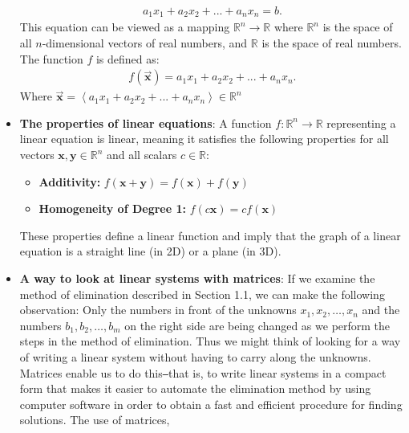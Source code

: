 \documentclass{report}
\begin{document}
\begin{itemize}
            \begin{align*}
                a_{1}x_{1} + a_{2}x_{2} + ... + a_{n}x_{n} = b
            .\end{align*}
            \bigbreak \noindent 
            This equation can be viewed as a mapping $\mathbb{R}^{n} \to \mathbb{R}$ where $\mathbb{R}^{n}$ is the space of all $n$-dimensional vectors of real numbers, and $\mathbb{R}$ is the space of real numbers. The function $f$ is defined as:
            \begin{align*}
                f(\vec{\mathbf{x}}) =  a_{1}x_{1} + a_{2}x_{2} + ... + a_{n}x_{n}
            .\end{align*}
             Where $\vec{\mathbf{x}} = \left\langle a_{1}x_{1} + a_{2}x_{2} + ... + a_{n}x_{n} \right\rangle \in \mathbb{R}^{n}$
         \item \textbf{The properties of linear equations}:
             A function \( f: \mathbb{R}^n \rightarrow \mathbb{R} \) representing a linear equation is linear, meaning it satisfies the following properties for all vectors \( \mathbf{x}, \mathbf{y} \in \mathbb{R}^n \) and all scalars \( c \in \mathbb{R} \):
             \begin{itemize}
                 \item \textbf{Additivity:} \( f(\mathbf{x} + \mathbf{y}) = f(\mathbf{x}) + f(\mathbf{y}) \)
                 \item \textbf{Homogeneity of Degree 1:} \( f(c\mathbf{x}) = cf(\mathbf{x}) \)
             \end{itemize}
             These properties define a linear function and imply that the graph of a linear equation is a straight line (in 2D) or a plane (in 3D).
         \item \textbf{A way to look at linear systems with matrices}:
             If we examine the method of elimination described in Section 1.1, we can make the 
             following observation: Only the numbers in front of the unknowns $x_1, x_2, \ldots, x_n$ 
             and the numbers $b_1, b_2, \ldots, b_m$ on the right side are being changed as we perform 
             the steps in the method of elimination. Thus we might think of looking for a way 
             of writing a linear system without having to carry along the unknowns. Matrices 
             enable us to do this\texttt{--}that is, to write linear systems in a compact form that makes 
             it easier to automate the elimination method by using computer software in order 
             to obtain a fast and efficient procedure for finding solutions. The use of matrices, 

\end{itemize}
\end{document}
